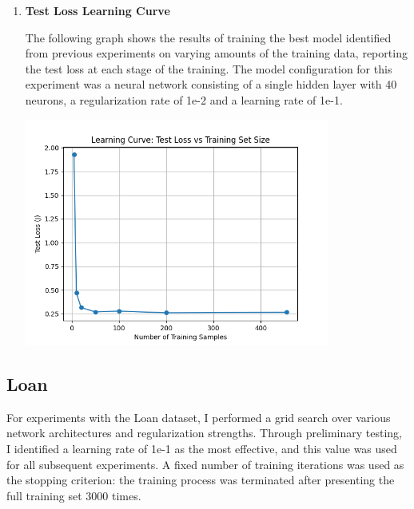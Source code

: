 \documentclass[letterpaper]{article}
\begin{document}
\begin{enumerate}
\item \textbf{Test Loss Learning Curve}

    The following graph shows the results of training the best model identified from previous experiments on varying amounts of the training data, reporting the test loss at each stage of the training. The model configuration for this experiment was a neural network consisting of a single hidden layer with 40 neurons, a regularization rate of 1e-2 and a learning rate of 1e-1.

     \vspace{0.2in}
        \begin{minipage}{\linewidth}
            \centering
            \includegraphics[width=10cm]{figures/wdbc_test_loss.png}
        \end{minipage}
        \vspace{0.1in}

        
\end{enumerate}

\newpage
\subsection{Loan}

For experiments with the Loan dataset, I performed a grid search over various network architectures and regularization strengths. Through preliminary testing, I identified a learning rate of 1e-1 as the most effective, and this value was used for all subsequent experiments. A fixed number of training iterations was used as the stopping criterion: the training process was terminated after presenting the full training set 3000 times.
\end{document}
